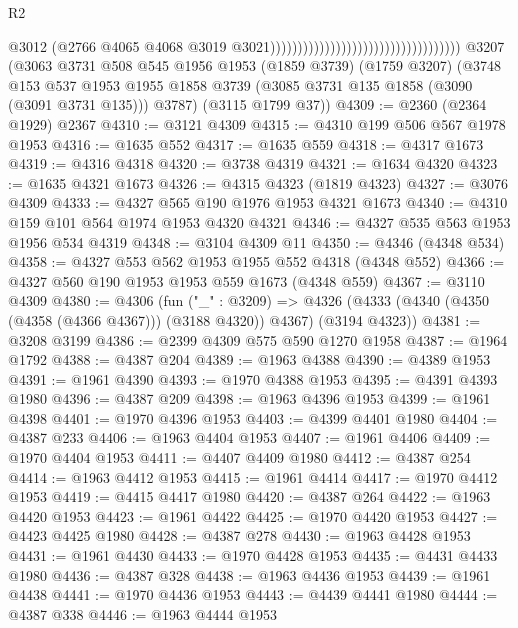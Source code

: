 \begin{lexlean}{R2}
\begin{coremodule}
                                                                        @3012
                                                                        (@2766
                                                                          @4065
                                                                          @4068
                                                                          @3019
                                                                          @3021)))))))))))))))))))))))))))))))))))
    @3207
    (@3063
      @3731
      @508
      @545
      @1956
      @1953
      (@1859 @3739)
      (@1759 @3207)
      (@3748
        @153
        @537
        @1953
        @1955
        @1858
        @3739
        (@3085 @3731 @135 @1858 (@3090 (@3091 @3731 @135)))
        @3787)
      (@3115 @1799 @37))
@4309 := @2360 (@2364 @1929) @2367
@4310 := @3121 @4309
@4315 := @4310 @199 @506 @567 @1978 @1953
@4316 := @1635 @552
@4317 := @1635 @559
@4318 := @4317 @1673
@4319 := @4316 @4318
@4320 := @3738 @4319
@4321 := @1634 @4320
@4323 := @1635 @4321 @1673
@4326 := @4315 @4323 (@1819 @4323)
@4327 := @3076 @4309
@4333 := @4327 @565 @190 @1976 @1953 @4321 @1673
@4340 := @4310 @159 @101 @564 @1974 @1953 @4320 @4321
@4346 := @4327 @535 @563 @1953 @1956 @534 @4319
@4348 := @3104 @4309 @11
@4350 := @4346 (@4348 @534)
@4358 := @4327 @553 @562 @1953 @1955 @552 @4318 (@4348 @552)
@4366 := @4327 @560 @190 @1953 @1953 @559 @1673 (@4348 @559)
@4367 := @3110 @4309
@4380 := @4306
    (fun ("_" : @3209) =>
    @4326 (@4333 (@4340 (@4350 (@4358 (@4366 @4367))) (@3188 @4320)) @4367) (@3194 @4323))
@4381 := @3208 @3199
@4386 := @2399 @4309 @575 @590 @1270 @1958
@4387 := @1964 @1792
@4388 := @4387 @204
@4389 := @1963 @4388
@4390 := @4389 @1953
@4391 := @1961 @4390
@4393 := @1970 @4388 @1953
@4395 := @4391 @4393 @1980
@4396 := @4387 @209
@4398 := @1963 @4396 @1953
@4399 := @1961 @4398
@4401 := @1970 @4396 @1953
@4403 := @4399 @4401 @1980
@4404 := @4387 @233
@4406 := @1963 @4404 @1953
@4407 := @1961 @4406
@4409 := @1970 @4404 @1953
@4411 := @4407 @4409 @1980
@4412 := @4387 @254
@4414 := @1963 @4412 @1953
@4415 := @1961 @4414
@4417 := @1970 @4412 @1953
@4419 := @4415 @4417 @1980
@4420 := @4387 @264
@4422 := @1963 @4420 @1953
@4423 := @1961 @4422
@4425 := @1970 @4420 @1953
@4427 := @4423 @4425 @1980
@4428 := @4387 @278
@4430 := @1963 @4428 @1953
@4431 := @1961 @4430
@4433 := @1970 @4428 @1953
@4435 := @4431 @4433 @1980
@4436 := @4387 @328
@4438 := @1963 @4436 @1953
@4439 := @1961 @4438
@4441 := @1970 @4436 @1953
@4443 := @4439 @4441 @1980
@4444 := @4387 @338
@4446 := @1963 @4444 @1953

\end{coremodule}
\end{lexlean}
